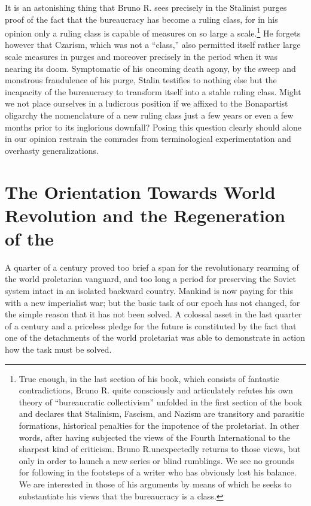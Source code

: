 It is an astonishing thing that Bruno R. sees precisely in the Stalinist purges proof of the fact that the bureaucracy has become a ruling class, for in his opinion only a ruling class is capable of measures on so large a scale.\footnote{True enough, in the last section of his book, which consists of fantastic contradictions, Bruno R. quite consciously and articulately refutes his own theory of “bureaucratic collectivism” unfolded in the first section of the book and declares that Stalinism, Fascism, and Nazism are transitory and parasitic formations, historical penalties for the impotence of the proletariat. In other words, after having subjected the views of the Fourth International to the sharpest kind of criticism. Bruno R.\@ unexpectedly returns to those views, but only in order to launch a new series or blind rumblings. We see no grounds for following in the footsteps of a writer who has obviously lost his balance. We are interested in those of his arguments by means of which he seeks to substantiate his views that the bureaucracy is a class.} He forgets however that Czarism, which was not a “class,” also permitted itself rather large scale measures in purges and moreover precisely in the period when it was nearing its doom. Symptomatic of his oncoming death agony, by the sweep and monstrous fraudulence of his purge, Stalin testifies to nothing else but the incapacity of the bureaucracy to transform itself into a stable ruling class. Might we not place ourselves in a ludicrous position if we affixed to the Bonapartist oligarchy the nomenclature of a new ruling class just a few years or even a few months prior to its inglorious downfall? Posing this question clearly should alone in our opinion restrain the comrades from terminological experimentation and overhasty generalizations.

\section*{The Orientation Towards World Revolution and the Regeneration of the \USSR}

A quarter of a century proved too brief a span for the revolutionary rearming of the world proletarian vanguard, and too long a period for preserving the Soviet system intact in an isolated backward country. Mankind is now paying for this with a new imperialist war; but the basic task of our epoch has not changed, for the simple reason that it has not been solved. A colossal asset in the last quarter of a century and a priceless pledge for the future is constituted by the fact that one of the detachments of the world proletariat was able to demonstrate in action how the task must be solved.

